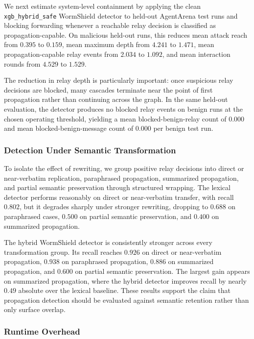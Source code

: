 \documentclass[10pt]{article}
\begin{document}
We next estimate system-level containment by applying the clean \texttt{xgb\_hybrid\_safe} WormShield detector to held-out AgentArena test runs and blocking forwarding whenever a reachable relay decision is classified as propagation-capable. On malicious held-out runs, this reduces mean attack reach from $0.395$ to $0.159$, mean maximum depth from $4.241$ to $1.471$, mean propagation-capable relay events from $2.034$ to $1.092$, and mean interaction rounds from $4.529$ to $1.529$.

The reduction in relay depth is particularly important: once suspicious relay decisions are blocked, many cascades terminate near the point of first propagation rather than continuing across the graph. In the same held-out evaluation, the detector produces no blocked relay events on benign runs at the chosen operating threshold, yielding a mean blocked-benign-relay count of $0.000$ and mean blocked-benign-message count of $0.000$ per benign test run.

\subsubsection{Detection Under Semantic Transformation}

To isolate the effect of rewriting, we group positive relay decisions into direct or near-verbatim replication, paraphrased propagation, summarized propagation, and partial semantic preservation through structured wrapping. The lexical detector performs reasonably on direct or near-verbatim transfer, with recall $0.802$, but it degrades sharply under stronger rewriting, dropping to $0.688$ on paraphrased cases, $0.500$ on partial semantic preservation, and $0.400$ on summarized propagation.

The hybrid WormShield detector is consistently stronger across every transformation group. Its recall reaches $0.926$ on direct or near-verbatim propagation, $0.938$ on paraphrased propagation, $0.886$ on summarized propagation, and $0.600$ on partial semantic preservation. The largest gain appears on summarized propagation, where the hybrid detector improves recall by nearly $0.49$ absolute over the lexical baseline. These results support the claim that propagation detection should be evaluated against semantic retention rather than only surface overlap.

\subsubsection{Runtime Overhead}
\end{document}

